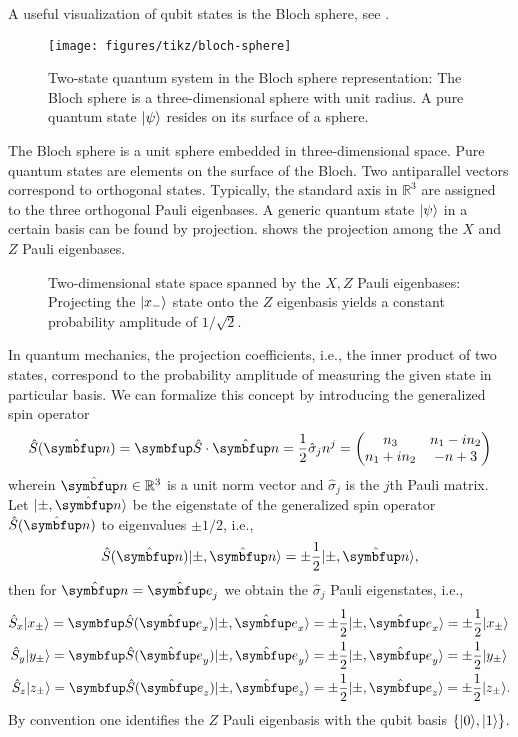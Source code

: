 A useful visualization of qubit states is the Bloch sphere, see .
\begin{figure}[htb]
	\centering
	\texttt{[image: figures/tikz/bloch-sphere]}
	\caption{Two-state quantum system in the Bloch sphere representation: The Bloch sphere is a three-dimensional sphere with unit radius. A pure quantum state  $\lvert\psi\rangle$ resides on its surface of a sphere.}\label{fig:bloch_sphere}
\end{figure}
The Bloch sphere is a unit sphere embedded in three-dimensional space.
Pure quantum states are elements on the surface of the Bloch.
Two antiparallel vectors correspond to orthogonal states.
Typically, the standard axis in $\mathbb{R}^3$ are assigned to the three orthogonal Pauli eigenbases.
A generic quantum state $\lvert\psi\rangle$ in a certain basis can be found by projection.
 shows the projection among the $X$ and $Z$ Pauli eigenbases.
\begin{figure}[htb]
	\centering
	
	\caption{Two-dimensional state space spanned by the $X,Z$ Pauli eigenbases: Projecting the $\lvert x_-\rangle$ state onto the $Z$ eigenbasis yields a constant probability amplitude of $1/\sqrt{2}$.}\label{fig:state_space_qubit}
\end{figure}
In quantum mechanics, the projection coefficients, i.e., the inner product of two states, correspond to the probability amplitude of measuring the given state in particular basis.
We can formalize this concept by introducing the generalized spin operator
\begin{equation}
	\hat{S}(\vu{n})
	=
	\vb{\hat{S}}\vdot\vu{n}
	=
	\frac{1}{2}
	\hat{\sigma}_jn^j
	=
	\begin{pmatrix}
		n_3 & n_1 - in_2 \\
		n_1 + in_2 & -n+3
	\end{pmatrix}
\end{equation}
wherein $\vu{n}\in\mathbb{R}^3$ is a unit norm vector and $\hat{\sigma}_j$ is the $j$th Pauli matrix.
Let $\ket{\pm,\vu{n}}$ be the eigenstate of the generalized spin operator $\hat{S}(\vu{n})$ to eigenvalues $\pm1/2$, i.e.,
\begin{equation}
	\hat{S}(\vu{n})
	\ket{\pm,\vu{n}}
	=
	\pm\frac{1}{2}
	\ket{\pm,\vu{n}},
\end{equation}
then for $\vu{n}=\vu{e}_j$ we obtain the $\hat{\sigma}_j$ Pauli eigenstates, i.e.,
\begin{align}
	\hat{S}_x
	\ket{x_\pm}
	=	
	\vb{\hat{S}}(\vu{e}_x)
	\ket{\pm,\vu{e}_x}
	&=
	\pm\frac{1}{2}
	\ket{\pm,\vu{e}_x}
	=
	\pm\frac{1}{2}
	\ket{x_\pm}
	\\
	\hat{S}_y
	\ket{y_\pm}
	=	
	\vb{\hat{S}}(\vu{e}_y)
	\ket{\pm,\vu{e}_y}
	&=
	\pm\frac{1}{2}
	\ket{\pm,\vu{e}_y}
	=
	\pm\frac{1}{2}
	\ket{y_\pm}
	\\
	\hat{S}_z
	\ket{z_\pm}
	=	
	\vb{\hat{S}}(\vu{e}_z)
	\ket{\pm,\vu{e}_z}
	&=
	\pm\frac{1}{2}
	\ket{\pm,\vu{e}_z}
	=
	\pm\frac{1}{2}
	\ket{z_\pm}
	.
\end{align}
By convention one identifies the $Z$ Pauli eigenbasis with the qubit basis $\left\{\lvert0\rangle,\lvert1\rangle\right\}$.

